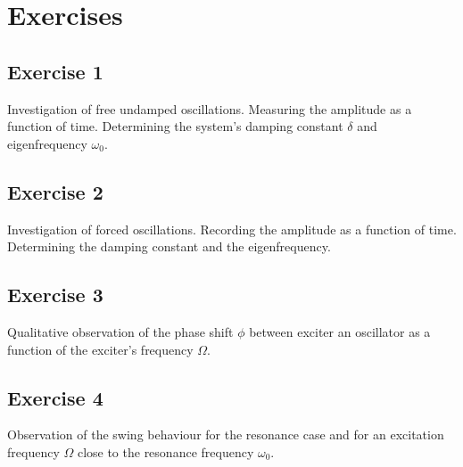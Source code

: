\section{Exercises}
\subsection*{Exercise 1}
Investigation of free undamped oscillations. Measuring the amplitude as a function of time. Determining the system's damping constant \(\delta\) and eigenfrequency \(\omega_0\).
\subsection*{Exercise 2}
Investigation of forced oscillations. Recording the amplitude as a function of time. Determining the damping constant and the eigenfrequency.
\subsection*{Exercise 3}
Qualitative observation of the phase shift \(\phi\) between exciter an oscillator as a function of the exciter's frequency \(\Omega\).
\subsection*{Exercise 4}
Observation of the swing behaviour for the resonance case and for an excitation frequency \(\Omega\) close to the resonance frequency \(\omega_0\).

